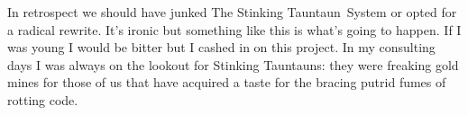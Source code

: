 In retrospect we should have junked The Stinking Tauntaun~System or
opted for a radical rewrite. It's ironic but something like this is
what's going to happen. If I was young I would be bitter but I cashed in
on this project. In my consulting days I was always on the lookout for
Stinking Tauntauns: they were freaking gold mines for those of us that
have acquired a taste for the bracing putrid fumes of rotting code.






%